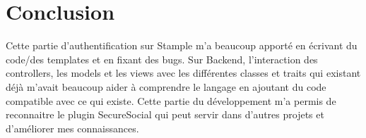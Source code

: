 \documentclass[12pt,oneside,a4paper]{article}
\begin{document}
\section{Conclusion}
Cette partie d'authentification sur Stample m'a beaucoup apporté en écrivant du code/des templates et en fixant des bugs.
Sur Backend, l'interaction des controllers, les models et les views avec les différentes classes et traits qui existant déjà m'avait beaucoup aider à comprendre le langage en ajoutant du code compatible avec ce qui existe.
Cette partie du développement m'a permis de reconnaitre le plugin SecureSocial qui peut servir dans d'autres projets et d'améliorer mes connaissances. 
\end{document}
